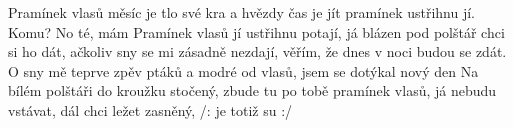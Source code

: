 \begin{TEXT}{Pramínek vlasů}
\SLOKA {} měsíc je tlo své  kra \NL
a hvězdy  čas je jít   \NL
pramínek  ustřihnu jí. \NL
Komu? No  té, mám   
\SLOKA Pramínek vlasů jí ustřihnu potají, \NL
já blázen pod polštář chci si ho dát, \NL
ačkoliv sny se mi zásadně nezdají, \NL
věřím, že dnes v noci budou se zdát. 
\SLOKA O sny mě  teprve  \NL
zpěv ptáků  a modré  \NL
od vlasů,  jsem se dotýkal  \NL
nový den    
\SLOKA Na bílém polštáři do kroužku stočený, \NL
zbude tu po tobě pramínek vlasů, \NL
já nebudu vstávat, dál chci ležet zasněný, \NL
/: je totiž  su :/ 
\end{TEXT}
